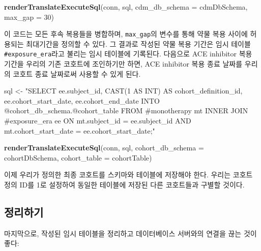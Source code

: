 \documentclass[11pt]{book}
\newenvironment{Shaded}{\begin{snugshade}}{\end{snugshade}}
\newcommand{\KeywordTok}[1]{\textcolor[rgb]{0.13,0.29,0.53}{\textbf{#1}}}
\newcommand{\DataTypeTok}[1]{\textcolor[rgb]{0.13,0.29,0.53}{#1}}
\newcommand{\DecValTok}[1]{\textcolor[rgb]{0.00,0.00,0.81}{#1}}
\newcommand{\StringTok}[1]{\textcolor[rgb]{0.31,0.60,0.02}{#1}}
\newcommand{\NormalTok}[1]{#1}
\theoremstyle{definition}
\theoremstyle{definition}
\theoremstyle{definition}
\theoremstyle{remark}
\begin{document}
\begin{Shaded}
\begin{Highlighting}[]
\KeywordTok{renderTranslateExecuteSql}\NormalTok{(conn,}
\NormalTok{                          sql,}
                          \DataTypeTok{cdm_db_schema =}\NormalTok{ cdmDbSchema,}
                          \DataTypeTok{max_gap =} \DecValTok{30}\NormalTok{)}
\end{Highlighting}
\end{Shaded}

이 코드는 모든 후속 복용들을 병합하며, \texttt{max\_gap}의 변수를 통해
약물 복용 사이에 허용되는 최대기간을 정의할 수 있다. 그 결과로 작성된
약물 복용 기간은 임시 테이블 \texttt{\#exposure\_era}라고 불리는 임시
테이블에 기록된다. 다음으로 ACE inhibitor 복용 기간을 우리의 기존
코호트에 조인하기만 하면, ACE inhibitor 복용 종료 날짜를 우리의 코호트
종료 날짜로써 사용할 수 있게 된다.

\begin{Shaded}
\begin{Highlighting}[]
\NormalTok{sql <-}\StringTok{ "SELECT ee.subject_id,}
\StringTok{  CAST(1 AS INT) AS cohort_definition_id,}
\StringTok{  ee.cohort_start_date,}
\StringTok{  ee.cohort_end_date}
\StringTok{INTO @cohort_db_schema.@cohort_table}
\StringTok{FROM #monotherapy mt}
\StringTok{INNER JOIN #exposure_era ee}
\StringTok{  ON mt.subject_id = ee.subject_id}
\StringTok{    AND mt.cohort_start_date = ee.cohort_start_date;"}

\KeywordTok{renderTranslateExecuteSql}\NormalTok{(conn,}
\NormalTok{                          sql,}
                          \DataTypeTok{cohort_db_schema =}\NormalTok{ cohortDbSchema,}
                          \DataTypeTok{cohort_table =}\NormalTok{ cohortTable)}
\end{Highlighting}
\end{Shaded}

이제 우리가 정의한 최종 코호트를 스키마와 테이블에 저장해야 한다. 우리는
코호트 정의 ID를 1로 설정하여 동일한 테이블에 저장된 다른 코호트들과
구별할 것이다.

\subsection{정리하기}

마지막으로, 작성된 임시 테이블을 정리하고 데이터베이스 서버와의 연결을
끊는 것이 좋다:
\end{document}

